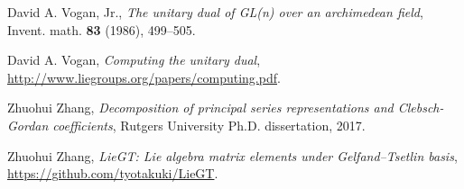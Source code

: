 \documentclass[12pt]{article}
\numberwithin{equation}{section}
\renewcommand\({\left(}
\renewcommand\){\right)}
\begin{document}
\begin{bibsection}
\begin{biblist}
David A. Vogan, Jr., {\it The unitary dual of GL(n) over an archimedean field}, Invent. math. {\bf 83} (1986), 499--505.


David A. Vogan,
{\it Computing the unitary dual}, \url{http://www.liegroups.org/papers/computing.pdf}.

Zhuohui Zhang, {\it Decomposition of principal series representations and Clebsch-Gordan coefficients},
Rutgers University Ph.D. dissertation, 2017.

Zhuohui Zhang,
{\it LieGT: Lie algebra matrix elements under Gelfand–Tsetlin basis},
\url{https://github.com/tyotakuki/LieGT}.


%
%
%
%
%
%
%
%
%
%
%
%
%
%
%

\end{biblist}
\end{bibsection}
\end{document}
